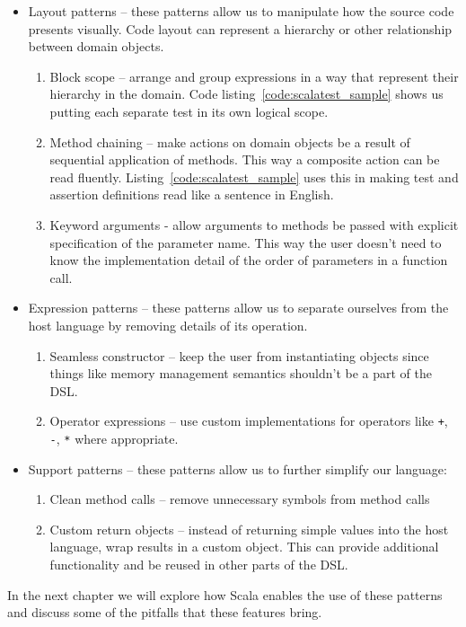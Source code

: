 \begin{itemize}
	\item Layout patterns -- these patterns allow us to manipulate how the source code presents visually.
Code layout can represent a hierarchy or other relationship between domain objects.
	\begin{enumerate}
		\item Block scope -- arrange and group expressions in a way that represent their hierarchy in the domain.
Code listing~\ref{code:scalatest_sample} shows us putting each separate test in its own logical scope.
		\item Method chaining -- make actions on domain objects be a result of sequential application of methods.
This way a composite action can be read fluently.
Listing~\ref{code:scalatest_sample} uses this in making test and assertion definitions read like a sentence in English.
		\item Keyword arguments - allow arguments to methods be passed with explicit specification of the parameter name.
This way the user doesn't need to know the implementation detail of the order of parameters in a function call.
	\end{enumerate}
	\item Expression patterns -- these patterns allow us to separate ourselves from the host language by removing details of its operation.
	\begin{enumerate}
		\item Seamless constructor -- keep the user from instantiating objects since things like memory management semantics shouldn't be a part of the DSL.
		\item Operator expressions -- use custom implementations for operators like \texttt{+}, \texttt{-}, \texttt{*} where appropriate.
	\end{enumerate}
	\item Support patterns -- these patterns allow us to further simplify our language:
	\begin{enumerate}
		\item Clean method calls -- remove unnecessary symbols from method calls
		\item Custom return objects -- instead of returning simple values into the host language, wrap results in a custom object.
This can provide additional functionality and be reused in other parts of the DSL.
	\end{enumerate}
\end{itemize}

In the next chapter we will explore how Scala enables the use of these patterns and discuss some of the pitfalls that these features bring.
